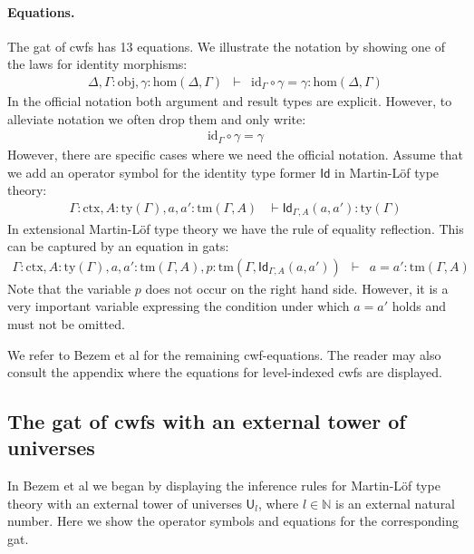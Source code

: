 \documentclass[11pt,a4paper]{article}
\theoremstyle{plain}
\theoremstyle{definition}
\newcommand{\Id}{\mathsf{Id}}
\newcommand{\id}{\mathsf{id}}
\newcommand{\UU}{\mathsf{U}}
\def\Nbb{\mathbb{N}}
\def\UU{\mathsf{U}}
\def\Obj{\mathrm{obj}}
\def\Hom{\mathrm{hom}}
\def\id{\mathrm{id}}
\newcommand{\ctx}{\mathrm{ctx}}
\newcommand{\ty}{\mathrm{ty}}
\newcommand{\tm}{\mathrm{tm}}
\begin{document}
\paragraph{Equations.}
The gat of cwfs has 13 equations. We illustrate the notation by showing one of the laws for identity morphisms:\begin{eqnarray*}
\Delta, \Gamma : \Obj, \gamma : \Hom(\Delta,\Gamma) &\vdash& \id_\Gamma \circ \gamma = \gamma : \Hom(\Delta,\Gamma)
\end{eqnarray*}
In the official notation both argument and result types are explicit. However, to alleviate notation we often drop them and only write:
\begin{eqnarray*}
\id_\Gamma \circ \gamma = \gamma
\end{eqnarray*}
However, there are specific cases where we need the official notation. Assume that we add an operator symbol for the identity type former $\Id$ in Martin-Löf type theory:
\begin{eqnarray*}
\Gamma : \ctx, A : \ty(\Gamma), a, a' : \tm(\Gamma, A) &\vdash \Id_{\Gamma,A}(a,a'): \ty(\Gamma)
\end{eqnarray*}
In extensional Martin-Löf type theory \cite{martinlof:hannover} we have the rule of equality reflection. This can be captured by an equation in gats:
\begin{eqnarray*}
\Gamma : \ctx, A : \ty(\Gamma), a, a' : \tm(\Gamma, A),p :  \tm(\Gamma,\Id_{\Gamma,A}(a,a'))&\vdash& a = a' : \tm(\Gamma,A)
\end{eqnarray*}
Note that the variable $p$ does not occur on the right hand side.
However, it is a very important variable expressing
the condition under which $a=a'$ holds and must not be omitted.

We refer to Bezem et al \cite{bezem:hofmann} for the remaining cwf-equations. The reader may also consult the appendix where the equations for level-indexed cwfs are displayed. 


\subsection{The gat of cwfs with an external tower of universes}
In Bezem et al \cite{BezemCDE22} we began by displaying the inference rules for Martin-Löf type theory with an external tower of universes $\UU_l$, where $l \in \Nbb$ is an external natural number. Here we show the operator symbols and equations for the corresponding gat.
\end{document}

